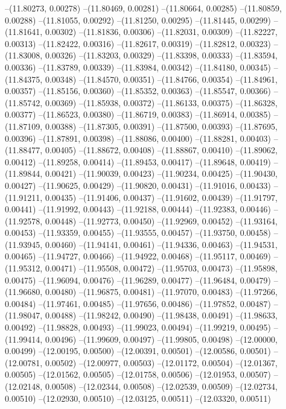 --(11.80273, 0.00278)
--(11.80469, 0.00281)
--(11.80664, 0.00285)
--(11.80859, 0.00288)
--(11.81055, 0.00292)
--(11.81250, 0.00295)
--(11.81445, 0.00299)
--(11.81641, 0.00302)
--(11.81836, 0.00306)
--(11.82031, 0.00309)
--(11.82227, 0.00313)
--(11.82422, 0.00316)
--(11.82617, 0.00319)
--(11.82812, 0.00323)
--(11.83008, 0.00326)
--(11.83203, 0.00329)
--(11.83398, 0.00333)
--(11.83594, 0.00336)
--(11.83789, 0.00339)
--(11.83984, 0.00342)
--(11.84180, 0.00345)
--(11.84375, 0.00348)
--(11.84570, 0.00351)
--(11.84766, 0.00354)
--(11.84961, 0.00357)
--(11.85156, 0.00360)
--(11.85352, 0.00363)
--(11.85547, 0.00366)
--(11.85742, 0.00369)
--(11.85938, 0.00372)
--(11.86133, 0.00375)
--(11.86328, 0.00377)
--(11.86523, 0.00380)
--(11.86719, 0.00383)
--(11.86914, 0.00385)
--(11.87109, 0.00388)
--(11.87305, 0.00391)
--(11.87500, 0.00393)
--(11.87695, 0.00396)
--(11.87891, 0.00398)
--(11.88086, 0.00400)
--(11.88281, 0.00403)
--(11.88477, 0.00405)
--(11.88672, 0.00408)
--(11.88867, 0.00410)
--(11.89062, 0.00412)
--(11.89258, 0.00414)
--(11.89453, 0.00417)
--(11.89648, 0.00419)
--(11.89844, 0.00421)
--(11.90039, 0.00423)
--(11.90234, 0.00425)
--(11.90430, 0.00427)
--(11.90625, 0.00429)
--(11.90820, 0.00431)
--(11.91016, 0.00433)
--(11.91211, 0.00435)
--(11.91406, 0.00437)
--(11.91602, 0.00439)
--(11.91797, 0.00441)
--(11.91992, 0.00443)
--(11.92188, 0.00444)
--(11.92383, 0.00446)
--(11.92578, 0.00448)
--(11.92773, 0.00450)
--(11.92969, 0.00452)
--(11.93164, 0.00453)
--(11.93359, 0.00455)
--(11.93555, 0.00457)
--(11.93750, 0.00458)
--(11.93945, 0.00460)
--(11.94141, 0.00461)
--(11.94336, 0.00463)
--(11.94531, 0.00465)
--(11.94727, 0.00466)
--(11.94922, 0.00468)
--(11.95117, 0.00469)
--(11.95312, 0.00471)
--(11.95508, 0.00472)
--(11.95703, 0.00473)
--(11.95898, 0.00475)
--(11.96094, 0.00476)
--(11.96289, 0.00477)
--(11.96484, 0.00479)
--(11.96680, 0.00480)
--(11.96875, 0.00481)
--(11.97070, 0.00483)
--(11.97266, 0.00484)
--(11.97461, 0.00485)
--(11.97656, 0.00486)
--(11.97852, 0.00487)
--(11.98047, 0.00488)
--(11.98242, 0.00490)
--(11.98438, 0.00491)
--(11.98633, 0.00492)
--(11.98828, 0.00493)
--(11.99023, 0.00494)
--(11.99219, 0.00495)
--(11.99414, 0.00496)
--(11.99609, 0.00497)
--(11.99805, 0.00498)
--(12.00000, 0.00499)
--(12.00195, 0.00500)
--(12.00391, 0.00501)
--(12.00586, 0.00501)
--(12.00781, 0.00502)
--(12.00977, 0.00503)
--(12.01172, 0.00504)
--(12.01367, 0.00505)
--(12.01562, 0.00505)
--(12.01758, 0.00506)
--(12.01953, 0.00507)
--(12.02148, 0.00508)
--(12.02344, 0.00508)
--(12.02539, 0.00509)
--(12.02734, 0.00510)
--(12.02930, 0.00510)
--(12.03125, 0.00511)
--(12.03320, 0.00511)
